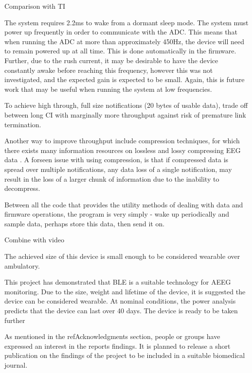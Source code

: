 \documentclass[]{article}
\begin{document}
Comparison with TI

The system requires 2.2ms to wake from a dormant sleep mode. The system must power up frequently in order to communicate with the \ac{ADC}. This means that when running the \ac{ADC} at more than approximately 450Hz, the device will need to remain powered up at all time. This is done automatically in the firmware. Further, due to the rush current, it may be desirable to have the device constantly awake before reaching this frequency, however this was not investigated, and the expected gain is expected to be small. Again, this is future work that may be useful when running the system at low frequencies. 



To achieve high through, full size notifications (20 bytes of usable data), trade off between long \ac{CI} with marginally more throughput against risk of premature link termination.

Another way to improve throughput include compression techniques, for which there exists many information resources on lossless and lossy compressing \ac{EEG} data \cite{Antoniol1997} \cite{Wongsawat2006}. A forseen issue with using compression, is that if compressed data is spread over multiple notifications, any data loss of a single notification, may result in the loss of a larger chunk of information due to the inability to decompress. 



Between all the code that provides the utility methods of dealing with data and firmware operations, the program is very simply - wake up periodically and sample data, perhaps store this data, then send it on. 

Combine with video

The achieved size of this device is small enough to be considered wearable over ambulatory. 


This project has demonstrated that \ac{BLE} is a suitable technology for \ac{AEEG} monitoring. Due to the size, weight and lifetime of the device, it is suggested the device can be considered wearable. At nominal conditions, the power analysis predicts that the device can last over 40 days. The device is ready to be taken further 

As mentioned in the ref{Acknowledgments} section, people or groups have expressed an interest in the reports findings. It is planned to release a short publication on the findings of the project to be included in a suitable biomedical journal. 
\end{document}
